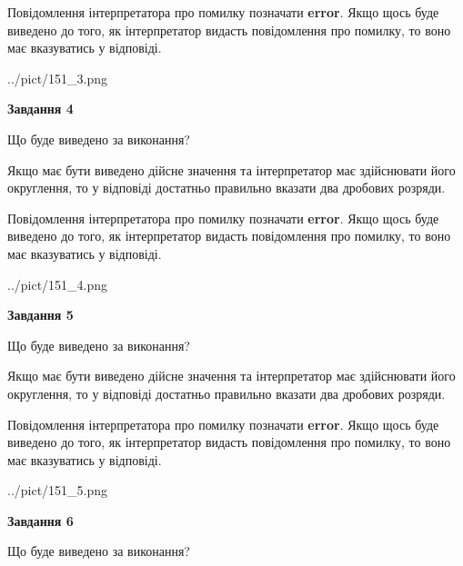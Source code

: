 \documentclass[12pt, ukrainian]{article}
\begin{document}
{\begin {Large}
Повідомлення інтерпретатора про помилку позначати \textbf{error}.
Якщо щось буде виведено до того, як інтерпретатор видасть повідомлення про помилку, 
то воно має вказуватись у відповіді. \par

\begin{center}
	{../pict/151_3.png}
\end{center}
\newpage

{\begin {center}\textbf{Завдання 4}\end {center}}\par
Що буде виведено за виконання? \par

Якщо має бути виведено дійсне значення та інтерпретатор має здійснювати його округлення, 
то у відповіді достатньо правильно вказати два дробових розряди.

Повідомлення інтерпретатора про помилку позначати \textbf{error}.
Якщо щось буде виведено до того, як інтерпретатор видасть повідомлення про помилку, 
то воно має вказуватись у відповіді. \par

\begin{center}
	{../pict/151_4.png}
\end{center}
\newpage

{\begin {center}\textbf{Завдання 5}\end {center}}\par
Що буде виведено за виконання? \par

Якщо має бути виведено дійсне значення та інтерпретатор має здійснювати його округлення, 
то у відповіді достатньо правильно вказати два дробових розряди.

Повідомлення інтерпретатора про помилку позначати \textbf{error}.
Якщо щось буде виведено до того, як інтерпретатор видасть повідомлення про помилку, 
то воно має вказуватись у відповіді. \par

\begin{center}
	{../pict/151_5.png}
\end{center}
\newpage

{\begin {center}\textbf{Завдання 6}\end {center}}\par
Що буде виведено за виконання? \par


\end{Large}}
\end{document}
